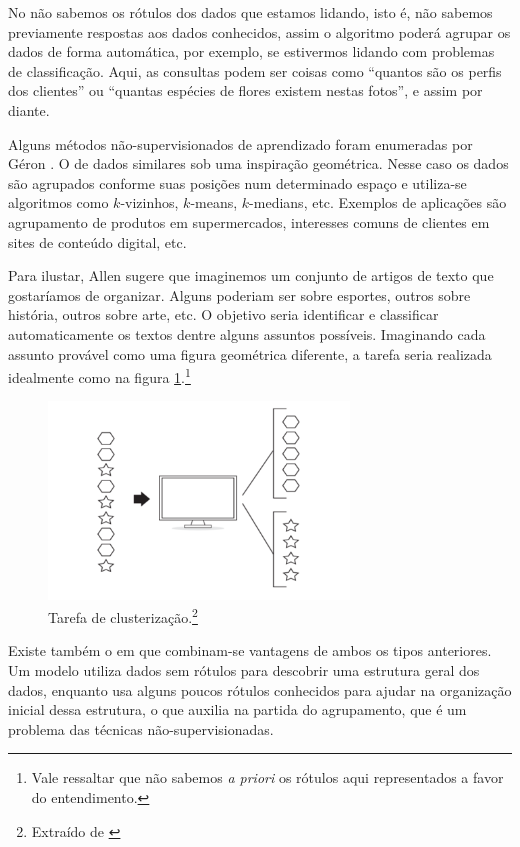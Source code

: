 No  não sabemos os rótulos dos dados que estamos lidando, isto é, não sabemos previamente respostas aos dados conhecidos, assim o algoritmo poderá agrupar os dados de forma automática, por exemplo, se estivermos lidando com problemas de classificação. Aqui, as consultas podem ser coisas como ``quantos são os perfis dos clientes'' ou ``quantas espécies de flores existem nestas fotos'', e assim por diante.

Alguns métodos não-supervisionados de aprendizado foram enumeradas por Géron \citep{hands}. O  de dados similares sob uma inspiração geométrica. Nesse caso os dados são agrupados conforme suas posições num determinado espaço e utiliza-se algoritmos como $k$-vizinhos, $k$-means, $k$-medians, etc. Exemplos de aplicações são agrupamento de produtos em supermercados, interesses comuns de clientes em sites de conteúdo digital, etc.

Para ilustar, Allen \citep{allen} sugere que imaginemos um conjunto de artigos de texto que gostaríamos de organizar. Alguns poderiam ser sobre esportes, outros sobre história, outros sobre arte, etc. O objetivo seria identificar e classificar automaticamente os textos dentre alguns assuntos possíveis. Imaginando cada assunto provável como uma figura geométrica diferente, a tarefa seria realizada idealmente como na figura \ref{fig:clustering}.\footnote{Vale ressaltar que não sabemos \emph{a priori} os rótulos aqui representados a favor do entendimento.}

\begin{figure}[htb]
\centering
\includegraphics[width=8cm]{figuras/clustering}
\caption{Tarefa de clusterização.\footnote{Extraído de \citep{allen}}}
\label{fig:clustering}
\end{figure}

Existe também o  em que combinam-se vantagens de ambos os tipos anteriores. Um modelo utiliza dados sem rótulos para descobrir uma estrutura geral dos dados, enquanto usa alguns poucos rótulos conhecidos para ajudar na organização inicial dessa estrutura, o que auxilia na partida do agrupamento, que é um problema das técnicas não-supervisionadas.

